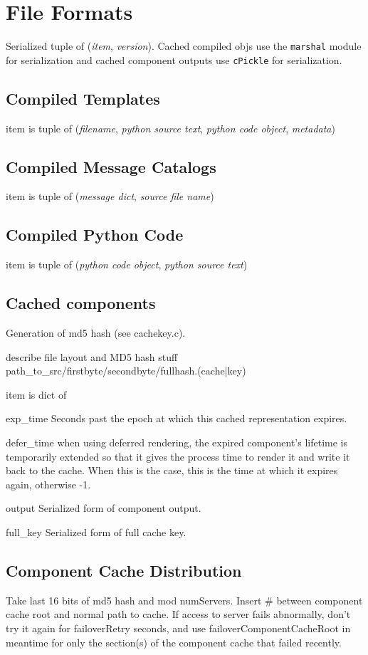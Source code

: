 \section{File Formats}
Serialized tuple of (\emph{item}, \emph{version}).  Cached compiled
objs use the \texttt{marshal} module for serialization and cached
component outputs use \texttt{cPickle} for serialization.

\subsection{Compiled Templates}
item is tuple of (\emph{filename}, \emph{python source text},
\emph{python code object}, \emph{metadata})

\subsection{Compiled Message Catalogs}
item is tuple of (\emph{message dict}, \emph{source file name})

\subsection{Compiled Python Code}
item is tuple of (\emph{python code object}, \emph{python source text})

\subsection{Cached components}
Generation of md5 hash (see cachekey.c). 

describe file layout and MD5 hash stuff
path\_to\_src/firstbyte/secondbyte/fullhash.(cache|key)

item is dict of 
\begin{argdesc}
\item[exp_time] Seconds past the epoch at which this cached
representation expires.
\item[defer_time] when using deferred rendering, the expired
component's lifetime is temporarily extended so that it gives the
process time to render it and write it back to the cache.  When this
is the case, this is the time at which it expires again, otherwise -1.
\item[output] Serialized form of component output.
\item[full_key] Serialized form of full cache key.
\end{argdesc}

\subsection{Component Cache Distribution}
Take last 16 bits of md5 hash and mod numServers.  Insert \# between
component cache root and normal path to cache.  If access to server
fails abnormally, don't try it again for failoverRetry seconds, and use
failoverComponentCacheRoot in meantime for only the section(s) of the
component cache that failed recently.

